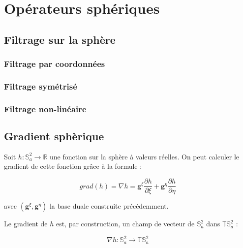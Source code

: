 
\chapter{Opérateurs sphériques}


\section{Filtrage sur la sphère}

\subsection{Filtrage par coordonnées}

\subsection{Filtrage symétrisé}

\subsection{Filtrage non-linéaire}


\section{Gradient sphèrique}

Soit $h : \mathbb{S}^2_a \rightarrow \mathbb{R}$ une fonction sur la sphère à valeurs réelles. On peut calculer le gradient de cette fonction grâce à la formule :

\begin{equation}
grad(h) = \nabla h = \mathbf{g}^{\xi} \dfrac{\partial h}{\partial \xi} + \mathbf{g}^{\eta} \dfrac{\partial h}{\partial \eta}
\label{eq:gradient}
\end{equation}

avec $(\mathbf{g}^{\xi}, \mathbf{g}^{\eta})$ la base duale construite précédemment.

\begin{remarque}
Le gradient de $h$ est, par construction, un champ de vecteur de $\mathbb{S}^2_a$ dans $\mathbb{T}\mathbb{S}^2_a$ :

\begin{equation}
\nabla h : \mathbb{S}^2_a \rightarrow \mathbb{T}\mathbb{S}^2_a
\end{equation}
\end{remarque}

